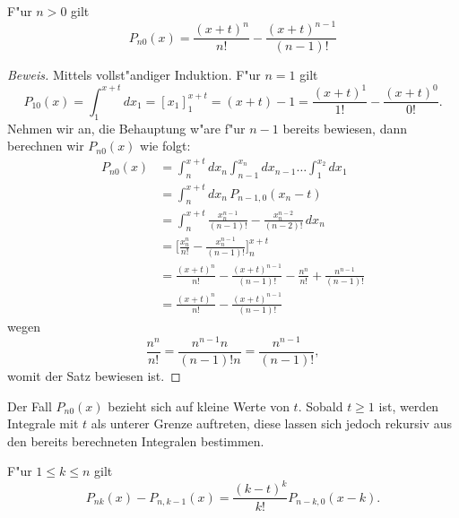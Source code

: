 \begin{satz}F"ur $n>0$ gilt
\begin{equation}
P_{n0}(x)=\frac{(x+t)^n}{n!}-\frac{(x+t)^{n-1}}{(n-1)!}
\end{equation}
\end{satz}
\begin{proof}[Beweis]
Mittels vollst"andiger Induktion.
F"ur $n=1$ gilt
\[
P_{10}(x)=\int_1^{x+t}dx_1=[x_1]_1^{x+t}=(x+t)-1=\frac{(x+t)^1}{1!}-\frac{(x+t)^0}{0!}.
\]
Nehmen wir an, die Behauptung w"are f"ur $n-1$ bereits bewiesen, dann
berechnen wir $P_{n0}(x)$ wie folgt:
\begin{align*}
P_{n0}(x)
&=
\int_n^{x+t}dx_n\int_{n-1}^{x_n}dx_{n-1}\dots\int_1^{x_2}dx_1
\\
&=
\int_n^{x+t}dx_n\,P_{n-1,0}(x_n-t)
\\
&=
\int_n^{x+t}\frac{x_n^{n-1}}{(n-1)!}-\frac{x_n^{n-2}}{(n-2)!}\,dx_n
\\
&=
\biggl[\frac{x_n^n}{n!}-\frac{x_n^{n-1}}{(n-1)!}\biggr]_n^{x+t}
\\
&=
\frac{(x+t)^n}{n!}-\frac{(x+t)^{n-1}}{(n-1)!}
-\frac{n^n}{n!}+\frac{n^{n-1}}{(n-1)!}
\\
&=
\frac{(x+t)^n}{n!}-\frac{(x+t)^{n-1}}{(n-1)!}
\end{align*}
wegen
\[
\frac{n^n}{n!}=\frac{n^{n-1}n}{(n-1)! n}=\frac{n^{n-1}}{(n-1)!},
\]
womit der Satz bewiesen ist.
\end{proof}

Der Fall $P_{n0}(x)$ bezieht sich auf kleine Werte von $t$.
Sobald 
$t\ge 1$ ist, werden Integrale mit $t$ als unterer Grenze auftreten,
diese lassen sich jedoch rekursiv aus den bereits berechneten
Integralen bestimmen.

\begin{satz}\label{kn-rekursion}
F"ur $1\le k\le n$ gilt
\begin{equation}
P_{nk}(x)-P_{n,k-1}(x)
=
\frac{(k-t)^k}{k!}P_{n-k,0}(x-k).
\end{equation}
\end{satz}

